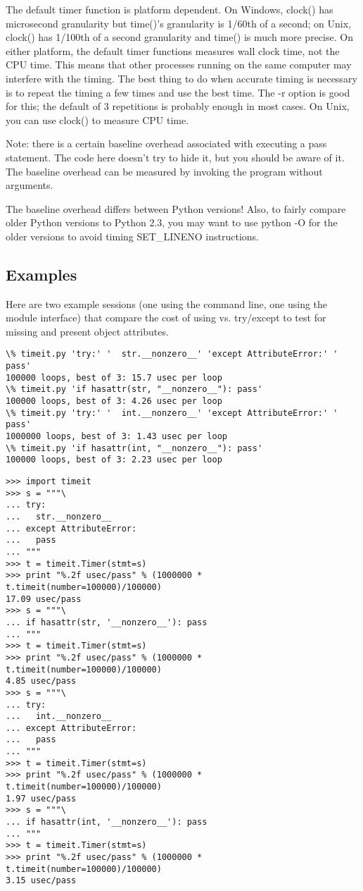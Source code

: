 The default timer function is platform dependent.  On Windows, clock() has
microsecond granularity but time()'s granularity is 1/60th of a second; on
Unix, clock() has 1/100th of a second granularity and time() is much more
precise.  On either platform, the default timer functions measures wall
clock time, not the CPU time.  This means that other processes running on
the same computer may interfere with the timing.  The best thing to do when
accurate timing is necessary is to repeat the timing a few times and use the
best time.  The -r option is good for this; the default of 3 repetitions is
probably enough in most cases.  On Unix, you can use clock() to measure CPU
time.

Note: there is a certain baseline overhead associated with executing a pass
statement.  The code here doesn't try to hide it, but you should be aware of
it.  The baseline overhead can be measured by invoking the program without
arguments.

The baseline overhead differs between Python versions!  Also, to fairly
compare older Python versions to Python 2.3, you may want to use python -O
for the older versions to avoid timing SET_LINENO instructions.

\subsection{Examples}

Here are two example sessions (one using the command line, one using the
module interface) that compare the cost of using 
vs. try/except to test for missing and present object attributes.

\begin{verbatim}
\% timeit.py 'try:' '  str.__nonzero__' 'except AttributeError:' '  pass'
100000 loops, best of 3: 15.7 usec per loop
\% timeit.py 'if hasattr(str, "__nonzero__"): pass'
100000 loops, best of 3: 4.26 usec per loop
\% timeit.py 'try:' '  int.__nonzero__' 'except AttributeError:' '  pass'
1000000 loops, best of 3: 1.43 usec per loop
\% timeit.py 'if hasattr(int, "__nonzero__"): pass'
100000 loops, best of 3: 2.23 usec per loop
\end{verbatim}

\begin{verbatim}
>>> import timeit
>>> s = """\
... try:
...   str.__nonzero__
... except AttributeError:
...   pass
... """
>>> t = timeit.Timer(stmt=s)
>>> print "%.2f usec/pass" % (1000000 * t.timeit(number=100000)/100000)
17.09 usec/pass
>>> s = """\
... if hasattr(str, '__nonzero__'): pass
... """
>>> t = timeit.Timer(stmt=s)
>>> print "%.2f usec/pass" % (1000000 * t.timeit(number=100000)/100000)
4.85 usec/pass
>>> s = """\
... try:
...   int.__nonzero__
... except AttributeError:
...   pass 
... """
>>> t = timeit.Timer(stmt=s)
>>> print "%.2f usec/pass" % (1000000 * t.timeit(number=100000)/100000)
1.97 usec/pass
>>> s = """\
... if hasattr(int, '__nonzero__'): pass
... """
>>> t = timeit.Timer(stmt=s)
>>> print "%.2f usec/pass" % (1000000 * t.timeit(number=100000)/100000)
3.15 usec/pass
\end{verbatim}
